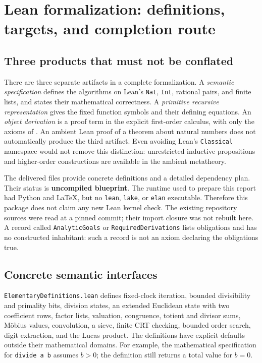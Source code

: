 \section{Lean formalization: definitions, targets, and completion route}
\label{sec:lean}

\subsection{Three products that must not be conflated}
There are three separate artifacts in a complete formalization. A \emph{semantic specification} defines the algorithms on Lean's \texttt{Nat}, \texttt{Int}, rational pairs, and finite lists, and states their mathematical correctness. A \emph{primitive recursive representation} gives the fixed function symbols and their defining equations. An \emph{object derivation} is a proof term in the explicit first-order calculus, with only the axioms of \ipra. An ambient Lean proof of a theorem about natural numbers does not automatically produce the third artifact. Even avoiding Lean's \texttt{Classical} namespace would not remove this distinction: unrestricted inductive propositions and higher-order constructions are available in the ambient metatheory.

The delivered files provide concrete definitions and a detailed dependency plan. Their status is \textbf{uncompiled blueprint}. The runtime used to prepare this report had Python and \LaTeX, but no \texttt{lean}, \texttt{lake}, or \texttt{elan} executable. Therefore this package does not claim any new Lean kernel check. The existing repository sources were read at a pinned commit; their import closure was not rebuilt here. A record called \texttt{AnalyticGoals} or \texttt{RequiredDerivations} lists obligations and has no constructed inhabitant: such a record is not an axiom declaring the obligations true.

\subsection{Concrete semantic interfaces}
\texttt{ElementaryDefinitions.lean} defines fixed-clock iteration, bounded divisibility and primality bits, division states, an extended Euclidean state with two coefficient rows, factor lists, valuation, congruence, totient and divisor sums, M\"obius values, convolution, a sieve, finite CRT checking, bounded order search, digit extraction, and the Lucas product. The definitions have explicit defaults outside their mathematical domains. For example, the mathematical specification for \texttt{divide a b} assumes $b>0$; the definition still returns a total value for $b=0$.

